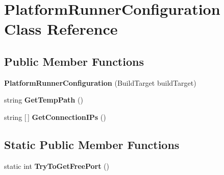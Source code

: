 \hypertarget{class_platform_runner_configuration}{}\section{Platform\+Runner\+Configuration Class Reference}
\label{class_platform_runner_configuration}
\subsection*{Public Member Functions}
\begin{DoxyCompactItemize}
\item 
\mbox{\label{class_platform_runner_configuration_a4adea0199fdac13690596a0161b0eaf6}} 
{\bfseries Platform\+Runner\+Configuration} (Build\+Target build\+Target)
\item 
\mbox{\label{class_platform_runner_configuration_a55090bed53fbd0da69378a623d932b01}} 
string {\bfseries Get\+Temp\+Path} ()
\item 
\mbox{\label{class_platform_runner_configuration_a50c37d1fe8968a962b85025d399b8171}} 
string \mbox{[}$\,$\mbox{]} {\bfseries Get\+Connection\+I\+Ps} ()
\end{DoxyCompactItemize}
\subsection*{Static Public Member Functions}
\begin{DoxyCompactItemize}
\item 
\mbox{\label{class_platform_runner_configuration_a767b77dfba2c91b793f1103625af96e4}} 
static int {\bfseries Try\+To\+Get\+Free\+Port} ()
\end{DoxyCompactItemize}
